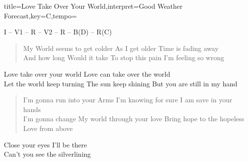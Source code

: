 \documentclass{leadsheet-modern}
\begin{document}
\begin{song}{title={Love Take Over Your World},interpret={Good Weather Forecast},key={C},tempo={}}

\begin{schedule}
I -- V1 -- R -- V2 -- R -- B(D) -- R(C)
\end{schedule}

\begin{verse}
My World seems to get colder
As I get older
Time is fading away \\
And how long
Would it take
To stop this pain
I'm feeling so wrong
\end{verse}

\begin{chorus}
Love take over your world
Love can take over the world \\
Let the world keep turning
The sun keep shining
But you are still in my hand
\end{chorus}

\begin{verse}
I'm gonna run into your Arms
I'm knowing for sure
I am save in your hands \\
I'm gonna change
My world through your love
Bring hope to the hopeless
Love from above
\end{verse}

\begin{bridge}
Close your eyes
I'll be there \\
Can't you see the silverlining
\end{bridge}

\end{song}
\end{document}
